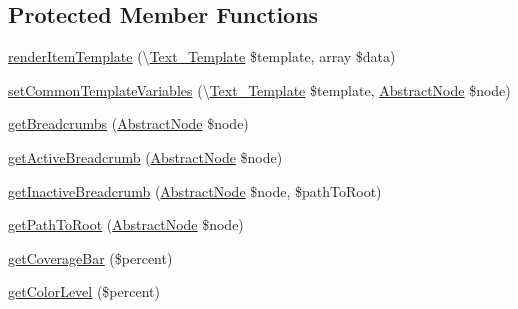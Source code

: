 \subsection*{Protected Member Functions}
\begin{DoxyCompactItemize}
\item 
\mbox{\hyperlink{class_sebastian_bergmann_1_1_code_coverage_1_1_report_1_1_html_1_1_renderer_a29bd9afaf1b8a8a5fea5d526a0d97406}{render\+Item\+Template}} (\textbackslash{}\mbox{\hyperlink{class_text___template}{Text\+\_\+\+Template}} \$template, array \$data)
\item 
\mbox{\hyperlink{class_sebastian_bergmann_1_1_code_coverage_1_1_report_1_1_html_1_1_renderer_a5b2a01ac0e4b829cbfdb20516806d13f}{set\+Common\+Template\+Variables}} (\textbackslash{}\mbox{\hyperlink{class_text___template}{Text\+\_\+\+Template}} \$template, \mbox{\hyperlink{class_sebastian_bergmann_1_1_code_coverage_1_1_node_1_1_abstract_node}{Abstract\+Node}} \$node)
\item 
\mbox{\hyperlink{class_sebastian_bergmann_1_1_code_coverage_1_1_report_1_1_html_1_1_renderer_a812aeee7ce2914b60dd5788e2d50df7a}{get\+Breadcrumbs}} (\mbox{\hyperlink{class_sebastian_bergmann_1_1_code_coverage_1_1_node_1_1_abstract_node}{Abstract\+Node}} \$node)
\item 
\mbox{\hyperlink{class_sebastian_bergmann_1_1_code_coverage_1_1_report_1_1_html_1_1_renderer_a6b2c52557e1f5e4283ad48cfcf85ee9c}{get\+Active\+Breadcrumb}} (\mbox{\hyperlink{class_sebastian_bergmann_1_1_code_coverage_1_1_node_1_1_abstract_node}{Abstract\+Node}} \$node)
\item 
\mbox{\hyperlink{class_sebastian_bergmann_1_1_code_coverage_1_1_report_1_1_html_1_1_renderer_ade9eba7860196620eee40ada8f052477}{get\+Inactive\+Breadcrumb}} (\mbox{\hyperlink{class_sebastian_bergmann_1_1_code_coverage_1_1_node_1_1_abstract_node}{Abstract\+Node}} \$node, \$path\+To\+Root)
\item 
\mbox{\hyperlink{class_sebastian_bergmann_1_1_code_coverage_1_1_report_1_1_html_1_1_renderer_a8e12a73b7c70d3bf86ed3930d947af13}{get\+Path\+To\+Root}} (\mbox{\hyperlink{class_sebastian_bergmann_1_1_code_coverage_1_1_node_1_1_abstract_node}{Abstract\+Node}} \$node)
\item 
\mbox{\hyperlink{class_sebastian_bergmann_1_1_code_coverage_1_1_report_1_1_html_1_1_renderer_a1fd93d49d3f4f025e565237d7fc64410}{get\+Coverage\+Bar}} (\$percent)
\item 
\mbox{\hyperlink{class_sebastian_bergmann_1_1_code_coverage_1_1_report_1_1_html_1_1_renderer_afc0e898cff7fa6cb031c048460857244}{get\+Color\+Level}} (\$percent)
\end{DoxyCompactItemize}
